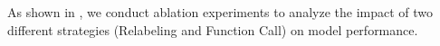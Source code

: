



As shown in , we conduct ablation experiments to analyze the impact of two different strategies (Relabeling and Function Call) on model performance.

